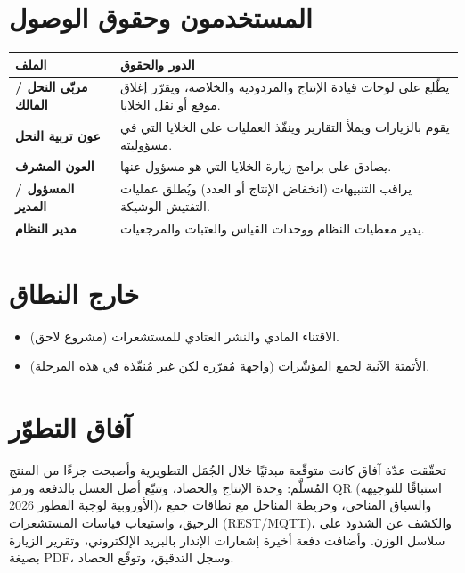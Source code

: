 \section{المستخدمون وحقوق الوصول}
\begin{xltabular}{\textwidth}{>{\bfseries}p{3.2cm} X}
\toprule
\textbf{الملف} & \textbf{الدور والحقوق} \\
\midrule
\endhead
مربّي النحل / المالك & يطّلع على لوحات قيادة الإنتاج والمردودية والخلاصة، ويقرّر إغلاق موقع أو نقل الخلايا. \\
عون تربية النحل & يقوم بالزيارات ويملأ التقارير وينفّذ العمليات على الخلايا التي في مسؤوليته. \\
العون المشرف & يصادق على برامج زيارة الخلايا التي هو مسؤول عنها. \\
المسؤول / المدير & يراقب التنبيهات (انخفاض الإنتاج أو العدد) ويُطلق عمليات التفتيش الوشيكة. \\
مدير النظام & يدير معطيات النظام ووحدات القياس والعتبات والمرجعيات. \\
\bottomrule
\end{xltabular}

\section{خارج النطاق}
\begin{itemize}
  \item الاقتناء المادي والنشر العتادي للمستشعرات (مشروع لاحق).
  \item الأتمتة الآنية لجمع المؤشّرات (واجهة مُقرّرة لكن غير مُنفّذة في هذه المرحلة).
\end{itemize}

\section{آفاق التطوّر}
تحقّقت عدّة آفاق كانت متوقّعة مبدئيًا خلال الجُمَل التطويرية وأصبحت جزءًا من المنتج
المُسلَّم: وحدة الإنتاج والحصاد، وتتبّع أصل العسل بالدفعة ورمز \textenglish{QR}
(استباقًا للتوجيهة الأوروبية لوجبة الفطور 2026)، والسياق المناخي، وخريطة المناحل مع
نطاقات جمع الرحيق، واستيعاب قياسات المستشعرات (\textenglish{REST/MQTT})، والكشف عن
الشذوذ على سلاسل الوزن. وأضافت دفعة أخيرة إشعارات الإنذار بالبريد الإلكتروني، وتقرير
الزيارة بصيغة \textenglish{PDF}، وسجل التدقيق، وتوقّع الحصاد.

